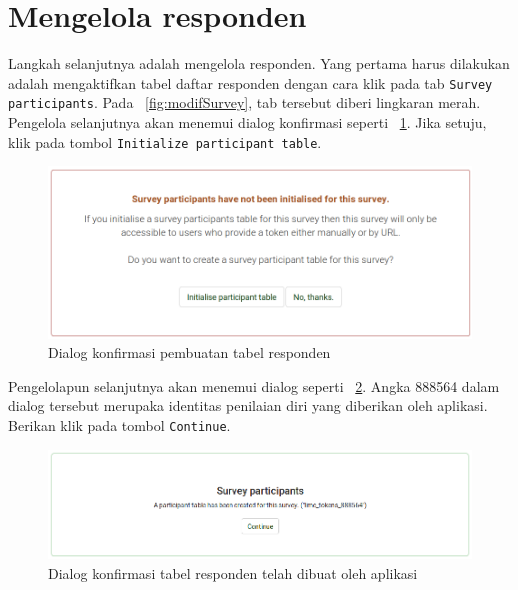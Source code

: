 \section{Mengelola responden}
Langkah selanjutnya adalah mengelola responden. Yang pertama harus dilakukan adalah mengaktifkan tabel daftar responden dengan cara klik pada tab \texttt{Survey participants}. Pada \figurename~\ref{fig:modifSurvey}, tab tersebut diberi lingkaran merah. Pengelola selanjutnya akan menemui dialog konfirmasi seperti \figurename~\ref{fig:tabelResponden}. Jika setuju, klik pada tombol \texttt{Initialize participant table}. 

\begin{figure}
  \begin{center}
    \includegraphics[scale=.35]{pics/konfirmasiPartisipan.png}
    \caption{Dialog konfirmasi pembuatan tabel responden}
    \label{fig:tabelResponden}
  \end{center}
\end{figure}

Pengelolapun selanjutnya akan menemui dialog seperti \figurename~\ref{fig:tabelResponden1}. Angka 888564 dalam dialog tersebut merupaka identitas penilaian diri yang diberikan oleh aplikasi. Berikan klik pada tombol \texttt{Continue}.

\begin{figure}
  \begin{center}
    \includegraphics[scale=.5]{pics/konfirmasiPartisipan1.png}
    \caption{Dialog konfirmasi tabel responden telah dibuat oleh aplikasi}
    \label{fig:tabelResponden1}
  \end{center}
\end{figure}

